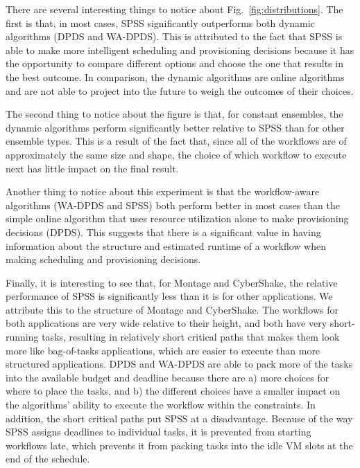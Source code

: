 \documentclass[conference]{IEEEtran}
\newcommand{\TODO}[1]{
  {\Large \textcolor{red}{\textbf{TODO: }#1}}
}
\begin{document}
There are several interesting things to notice about
Fig.~\ref{fig:distributions}. The first is that, in most cases, SPSS
significantly outperforms both dynamic algorithms (DPDS and WA-DPDS). This is
attributed to the fact that SPSS is able to make more intelligent scheduling
and provisioning decisions because it has the opportunity to compare different
options and choose the one that results in the best outcome. In comparison,
the dynamic algorithms are online algorithms and are not able to project into
the future to weigh the outcomes of their choices.

The second thing to notice about the figure is that, for constant ensembles,
the dynamic algorithms perform significantly better relative to SPSS than for
other ensemble types. This is a result of the fact that, since all of the
workflows are of approximately the same size and shape, the choice of which
workflow to execute next has little impact on the final result.

Another thing to notice about this experiment is that the workflow-aware
algorithms (WA-DPDS and SPSS) both perform better in most cases than the
simple online algorithm that uses resource utilization alone to make
provisioning decisions (DPDS). This suggests that there is a significant value
in having information about the structure and estimated runtime of a workflow
when making scheduling and provisioning decisions.

Finally, it is interesting to see that, for Montage and CyberShake, the
relative performance of SPSS is significantly less than it is for other
applications. We attribute this to the structure of Montage and CyberShake.
The workflows for both applications are very wide relative to their height,
and both have very short-running tasks, resulting  in relatively short
critical paths that makes them look more like bag-of-tasks applications, which are easier
to execute than more structured applications. DPDS and WA-DPDS are able to
pack more of the tasks into the available budget and deadline because there
are a) more choices for where to place the tasks, and b) the different choices
have a smaller impact on the algorithms' ability to execute the workflow
within the constraints. In addition, the short critical paths put SPSS at a
disadvantage. Because of the way SPSS assigns deadlines to individual tasks,
it is prevented from starting workflows late, which prevents it from packing
tasks into the idle VM slots at the end of the schedule.


%
\end{document}
